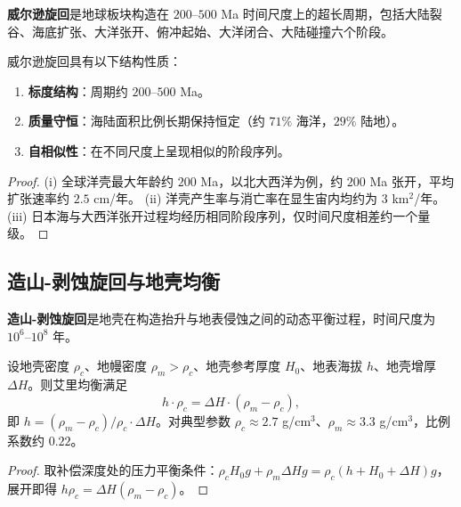 \begin{definition}[威尔逊旋回]\label{def:wilson_cycle}
\textbf{威尔逊旋回}是地球板块构造在 $200$--$500$ Ma 时间尺度上的超长周期，包括大陆裂谷、海底扩张、大洋张开、俯冲起始、大洋闭合、大陆碰撞六个阶段。
\end{definition}

\begin{proposition}[威尔逊旋回的结构性质]\label{prop:wilson_structure}
威尔逊旋回具有以下结构性质：
\begin{enumerate}[label=(\roman*)]
    \item \textbf{标度结构}：周期约 $200$--$500$ Ma。
    \item \textbf{质量守恒}：海陆面积比例长期保持恒定（约 $71\%$ 海洋，$29\%$ 陆地）。
    \item \textbf{自相似性}：在不同尺度上呈现相似的阶段序列。
\end{enumerate}
\end{proposition}

\begin{proof}
(i) 全球洋壳最大年龄约 $200$ Ma，以北大西洋为例，约 $200$ Ma 张开，平均扩张速率约 $2.5$ cm/年。
(ii) 洋壳产生率与消亡率在显生宙内均约为 $3$ km$^2$/年。
(iii) 日本海与大西洋张开过程均经历相同阶段序列，仅时间尺度相差约一个量级。
\end{proof}

\subsection{造山-剥蚀旋回与地壳均衡}

\begin{definition}[造山-剥蚀旋回]\label{def:orogenic_denudation_cycle}
\textbf{造山-剥蚀旋回}是地壳在构造抬升与地表侵蚀之间的动态平衡过程，时间尺度为 $10^6$--$10^8$ 年。
\end{definition}

\begin{proposition}[地壳均衡的定量模型]\label{prop:isostasy_model}
设地壳密度 $\rho_c$、地幔密度 $\rho_m>\rho_c$、地壳参考厚度 $H_0$、地表海拔 $h$、地壳增厚 $\Delta H$。则艾里均衡满足
\[
h\cdot\rho_c=\Delta H\cdot(\rho_m-\rho_c),
\]
即 $h=(\rho_m-\rho_c)/\rho_c\cdot\Delta H$。对典型参数 $\rho_c\approx 2.7$ g/cm$^3$、$\rho_m\approx 3.3$ g/cm$^3$，比例系数约 $0.22$。
\end{proposition}

\begin{proof}
取补偿深度处的压力平衡条件：$\rho_cH_0g+\rho_m\Delta Hg=\rho_c(h+H_0+\Delta H)g$，展开即得 $h\rho_c=\Delta H(\rho_m-\rho_c)$。
\end{proof}

